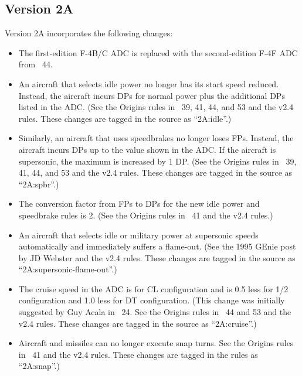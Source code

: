 \documentclass[10pt]{article}
\begin{document}
\subsection{Version 2A}

Version 2A incorporates the following changes:

\begin{itemize}

    \item The first-edition F-4B/C ADC is replaced with the second-edition F-4F ADC from {\APJ}~44.

    \item An aircraft that selects idle power no longer has its start speed reduced. Instead, the aircraft incurs DPs for normal power plus the additional DPs listed in the ADC. (See the Origins rules in {\APJ}~39, 41, 44, and 53 and the v2.4 rules. These changes are tagged in the source as “2A:idle”.) 

    \item Similarly, an aircraft that uses speedbrakes no longer loses FPs. Instead, the aircraft incurs DPs up to the value shown in the ADC. If the aircraft is supersonic, the maximum is increased by 1 DP. (See the Origins rules in {\APJ}~39, 41, 44, and 53 and the v2.4 rules. These changes are tagged in the source as “2A:spbr”.) 

    \item The conversion factor from FPs to DPs for the new idle power and speedbrake rules is 2. (See the Origins rules in {\APJ}~41 and the v2.4 rules.)

    \item An aircraft that selects idle or military power at supersonic speeds automatically and immediately suffers a flame-out. (See the 1995 GEnie post by JD Webster and the v2.4 rules. These changes are tagged in the source as “2A:supersonic-flame-out”.)

    \item The cruise speed in the ADC is for CL configuration and is 0.5 less for 1/2 configuration and 1.0 less for DT configuration. (This change was initially suggested by Guy Acala in {\APJ}~24. See the Origins rules in {\APJ}~44 and 53 and the v2.4 rules. These changes are tagged in the source as “2A:cruise”.) 

    \item Aircraft and missiles can no longer execute snap turns. See the Origins rules in {\APJ}~41 and the v2.4 rules. These changes are tagged in the rules as “2A:snap”.)


\end{itemize}
\end{document}
